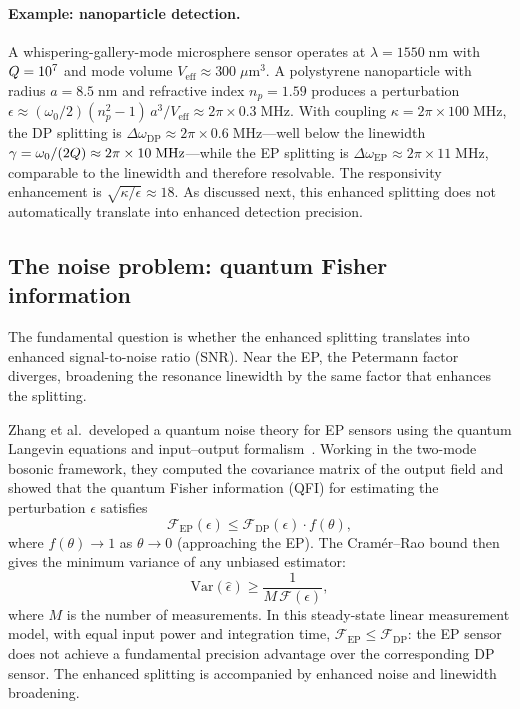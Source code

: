 \paragraph{Example: nanoparticle detection.}
A whispering-gallery-mode microsphere sensor operates at
$\lambda = 1550\;\mathrm{nm}$ with $Q = 10^7$ and mode volume
$V_{\mathrm{eff}} \approx 300\;\mu\mathrm{m}^3$. A polystyrene
nanoparticle with radius $a = 8.5\;\mathrm{nm}$ and refractive index
$n_p = 1.59$ produces a perturbation
$\epsilon \approx (\omega_0/2)(n_p^2 - 1)\,a^3/V_{\mathrm{eff}}
\approx 2\pi \times 0.3\;\mathrm{MHz}$. With coupling
$\kappa = 2\pi \times 100\;\mathrm{MHz}$, the DP splitting is
$\Delta\omega_{\mathrm{DP}} \approx 2\pi \times 0.6\;\mathrm{MHz}$---well
below the linewidth $\gamma = \omega_0/(2Q) \approx 2\pi \times
10\;\mathrm{MHz}$---while the EP splitting is
$\Delta\omega_{\mathrm{EP}} \approx 2\pi \times 11\;\mathrm{MHz}$,
comparable to the linewidth and therefore resolvable. The responsivity
enhancement is $\sqrt{\kappa/\epsilon} \approx 18$. As discussed
next, this enhanced splitting does not automatically translate into
enhanced detection precision.

\subsection{The noise problem: quantum Fisher information}
\label{ssec:noise-debate}

The fundamental question is whether the enhanced splitting translates
into enhanced signal-to-noise ratio (SNR). Near the EP, the
Petermann factor diverges, broadening the resonance linewidth by the
same factor that enhances the splitting.

Zhang et al.\ developed a quantum noise theory for EP sensors using
the quantum Langevin equations and input--output formalism~\cite{zhang2018quantum}.
Working in the two-mode bosonic framework, they computed the covariance
matrix of the output field and showed that the quantum Fisher
information (QFI) for estimating the perturbation $\epsilon$ satisfies
\begin{equation}
 \mathcal{F}_{\mathrm{EP}}(\epsilon) \le
 \mathcal{F}_{\mathrm{DP}}(\epsilon) \cdot f(\theta),
 \label{eq:qfi-bound}
\end{equation}
where $f(\theta) \to 1$ as $\theta \to 0$ (approaching the EP). The
Cram\'er--Rao bound then gives the minimum variance of any unbiased
estimator:
\begin{equation}
 \mathrm{Var}(\hat{\epsilon}) \ge \frac{1}{M\,\mathcal{F}(\epsilon)},
 \label{eq:cramer-rao}
\end{equation}
where $M$ is the number of measurements. In this steady-state linear
measurement model, with equal input power and integration time,
$\mathcal{F}_{\mathrm{EP}}\le\mathcal{F}_{\mathrm{DP}}$: the EP sensor
does not achieve a fundamental precision advantage over the corresponding
DP sensor. The enhanced splitting is accompanied by enhanced noise and
linewidth broadening.

